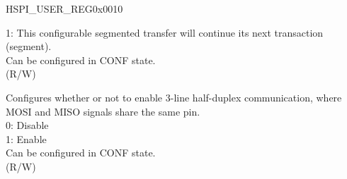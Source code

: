 \begin{register}{H}{SPI\_USER\_REG}{0x0010}
\begin{regdesc}
\begin{reglist}
1: This configurable segmented transfer will continue its next transaction (segment). \\
Can be configured in CONF state. \\
(R/W)
\label{fielddesc:SPISIO}\item [SPI\_SIO] Configures whether or not to enable 3-line half-duplex communication, where MOSI and MISO signals share the same pin.\\
0: Disable \\
1: Enable \\
Can be configured in CONF state.\\
(R/W)
\item [Continued on the next page...]
\end{reglist}\end{regdesc}
\end{register}

